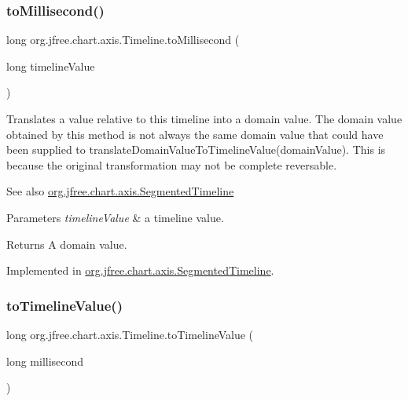 \subsubsection{\texorpdfstring{to\+Millisecond()}{toMillisecond()}}
{\footnotesize\ttfamily long org.\+jfree.\+chart.\+axis.\+Timeline.\+to\+Millisecond (\begin{DoxyParamCaption}\item[{long}]{timeline\+Value }\end{DoxyParamCaption})}

Translates a value relative to this timeline into a domain value. The domain value obtained by this method is not always the same domain value that could have been supplied to translate\+Domain\+Value\+To\+Timeline\+Value(domain\+Value). This is because the original transformation may not be complete reversable.

\begin{DoxySeeAlso}{See also}
\mbox{\hyperlink{classorg_1_1jfree_1_1chart_1_1axis_1_1_segmented_timeline}{org.\+jfree.\+chart.\+axis.\+Segmented\+Timeline}}
\end{DoxySeeAlso}

\begin{DoxyParams}{Parameters}
{\em timeline\+Value} & a timeline value.\\
\hline
\end{DoxyParams}
\begin{DoxyReturn}{Returns}
A domain value. 
\end{DoxyReturn}


Implemented in \mbox{\hyperlink{classorg_1_1jfree_1_1chart_1_1axis_1_1_segmented_timeline_a734fc49f503e38b51902dbee8f27c060}{org.\+jfree.\+chart.\+axis.\+Segmented\+Timeline}}.

\mbox{\label{interfaceorg_1_1jfree_1_1chart_1_1axis_1_1_timeline_a8723dcd01acdfba8854165da93d1d72a}} 
\subsubsection{\texorpdfstring{to\+Timeline\+Value()}{toTimelineValue()}\hspace{0.1cm}{\footnotesize\ttfamily [1/2]}}
{\footnotesize\ttfamily long org.\+jfree.\+chart.\+axis.\+Timeline.\+to\+Timeline\+Value (\begin{DoxyParamCaption}\item[{long}]{millisecond }\end{DoxyParamCaption})}

